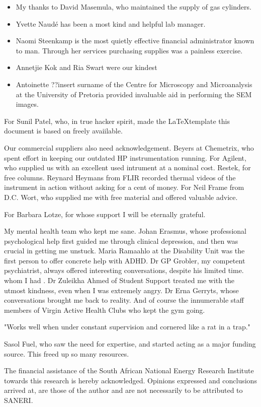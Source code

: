 \documentclass[
11pt, %
english, %
singlespacing, %
headsepline, %
]{MastersDoctoralThesis} %
\begin{document}
\begin{acknowledgements}
\begin{itemize}
\item My thanks to David Masemula, who maintained the supply of gas cylinders.

\item Yvette Naudé has been a most kind and helpful lab manager.

\item Naomi Steenkamp is the most quietly effective financial administrator known to
man. Through her services purchasing supplies was a painless exercise.
\item Annetjie Kok and Ria Swart were our kindest

\item Antoinette ??insert surname of the Centre for Microscopy and Microanalysis at
the University of Pretoria provided invaluable aid in performing the SEM images.

\end{itemize}

For Sunil Patel, who, in true hacker spirit, made the \LaTeX template this
document is based on freely avaiilable.

Our commercial suppliers also need acknowledgement. Beyers at Chemetrix, who
spent effort in keeping our outdated HP instrumentation running. For Agilent,
who supplied us with an excellent used intrument at a nominal cost. Restek, for
free columns. Reynard Heymans from FLIR recorded thermal videos of the
instrument in action without asking for a cent of money. For Neil Frame from
D.C. Wort, who supplied me with free material and offered valuable advice.

For Barbara Lotze, for whose support I will be eternally grateful. 

My mental health team who kept me sane. Johan Erasmus, whose professional
psychological help first guided me through clinical depression, and then was
crucial in getting me unstuck. Maria Ramaahlo at the Disability Unit was the
first person to offer concrete help with ADHD. Dr GP Grobler, my competent
psychiatrist, always offered interesting conversations, despite his limited
time. whom I had . Dr Zuleikha Ahmed of Student Support treated me with the
utmost kindness, even when I was extremely angry. Dr Erna Gerryts, whose
conversations brought me back to reality. And of course the innumerable staff
members of Virgin Active Health Clubs who kept the gym going. 

 "Works well when under constant supervision and cornered like a rat in a trap."


Sasol Fuel, who saw the need for expertise, and started acting as a major
funding source. This freed up so many resources.

The financial assistance of the South African National Energy Research Institute
towards this research is hereby acknowledged. Opinions expressed and conclusions
arrived at, are those of the author and are not necessarily to be attributed to
SANERI.

\end{acknowledgements}
\end{document}
